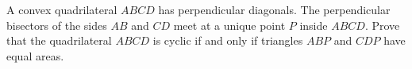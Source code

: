 A convex quadrilateral $ABCD$ has perpendicular diagonals. The perpendicular bisectors of the sides $AB$ and $CD$ meet at a unique point $P$ inside $ABCD$. Prove that the quadrilateral $ABCD$ is cyclic if and only if triangles $ABP$ and $CDP$ have equal areas.